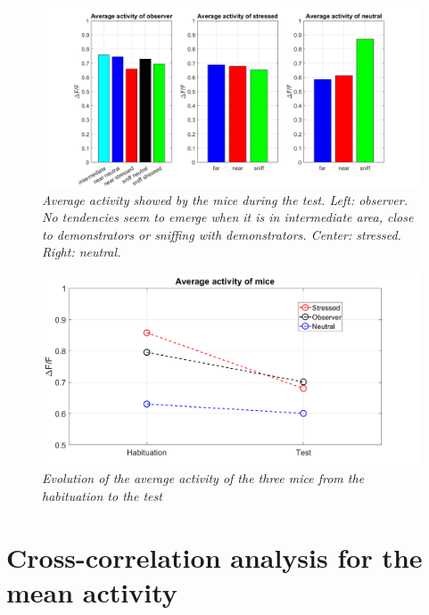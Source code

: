 \documentclass[12pt, a4paper]{report}
\begin{document}
\begin{figure}[H]
	
	\begin{center}
		\hspace*{-1.cm}
		\includegraphics[scale=.47]{activity_barplot.png} 
	\end{center} 
	\caption{\textit{Average activity showed by the mice during the test. Left: observer. No tendencies seem to emerge when it is in intermediate area, close to demonstrators or sniffing with demonstrators. Center: stressed.  Right: neutral.}} \label{activity_barplot}
	
\end{figure}


\begin{figure}[H]
	
	\begin{center}
		
		\includegraphics[scale=.45]{activities.png} 
	\end{center} 
	\caption{\textit{Evolution of the average activity of the three mice from the habituation to the test}}
	\label{activities}
\end{figure}


\section{Cross-correlation analysis for the mean activity}
\end{document}
